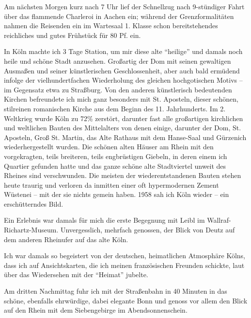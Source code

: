 Am nächsten Morgen kurz nach 7 Uhr lief der Schnellzug nach 9-stündiger Fahrt über das flammende Charleroi in Aachen ein; während der Grenzformalitäten nahmen die Reisenden ein im Wartesaal 1. Klasse schon bereitstehendes reichliches und gutes Frühstück für 80 Pf. ein.

In Köln machte ich 3 Tage Station, um mir diese alte \enquote{heilige} und damals noch heile und schöne Stadt anzusehen. Großartig der Dom mit seinen gewaltigen Ausmaßen und seiner künstlerischen Geschlossenheit, aber auch bald ermüdend infolge der vielhundertfachen Wiederholung des gleichen hochgotischen Motivs -- im Gegensatz etwa zu Straßburg. Von den anderen künstlerisch bedeutenden Kirchen befreundete ich mich ganz besonders mit St. Aposteln, dieser schönen, stilreinen romanischen Kirche aus dem Beginn des 11. Jahrhunderts. Im 2. Weltkrieg wurde Köln zu 72\% zerstört, darunter fast alle großartigen kirchlichen und weltlichen Bauten des Mittelalters von denen einige, darunter der Dom, St. Aposteln, Groß St. Martin, das Alte Rathaus mit dem Hanse-Saal und Gürzenich wiederhergestellt wurden. Die schönen alten Häuser am Rhein mit den vorgekragten, teils breiteren, teils engbrüstigen Giebeln, in deren einem ich Quartier gefunden hatte und das ganze schöne alte Stadtviertel unweit des Rheines sind verschwunden. Die meisten der wiederentstandenen Bauten stehen heute traurig und verloren da inmitten einer oft hypermodernen Zement Wüstenei -- mit der sie nichts gemein haben. 1958 sah ich Köln wieder -- ein erschütterndes Bild.

Ein Erlebnis war damals für mich die erste Begegnung mit Leibl im Wallraf-Richartz-Museum. Unvergesslich, mehrfach genossen, der Blick von Deutz auf dem anderen Rheinufer auf das alte Köln.

Ich war damals so begeistert von der deutschen, heimatlichen Atmosphäre Kölns, dass ich auf Ansichtskarten, die ich meinen französischen Freunden schickte, laut über das Wiedersehen mit der \enquote{Heimat} jubelte.

Am dritten Nachmittag fuhr ich mit der Straßenbahn in 40 Minuten in das schöne, ebenfalls ehrwürdige, dabei elegante Bonn und genoss vor allem den Blick auf den Rhein mit dem Siebengebirge im Abendsonnenschein.

